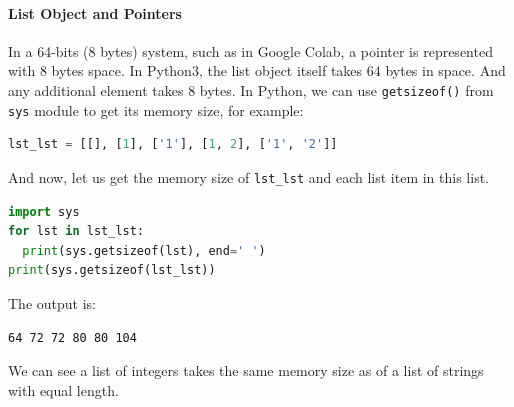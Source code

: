 \documentclass[../main.tex]{subfiles}
\begin{document}
\paragraph{List Object and Pointers} In a 64-bits (8 bytes) system, such as in Google Colab, a pointer is represented with 8 bytes space. In Python3, the list object itself takes $64$ bytes in space. And any additional element takes $8$ bytes. In Python, we can use \texttt{getsizeof()} from \texttt{sys} module to get its memory size, for example:
\begin{lstlisting}[language=Python]
lst_lst = [[], [1], ['1'], [1, 2], ['1', '2']]
\end{lstlisting}
And now, let us get the memory size of \texttt{lst\_lst} and each list item in this list.
\begin{lstlisting}[language=Python]
import sys
for lst in lst_lst:
  print(sys.getsizeof(lst), end=' ')
print(sys.getsizeof(lst_lst))
\end{lstlisting}
The output is:
\begin{lstlisting}[numbers=none]
64 72 72 80 80 104
\end{lstlisting}
We can see a list of integers takes the same memory size as of a list of strings with equal length.
\end{document}
